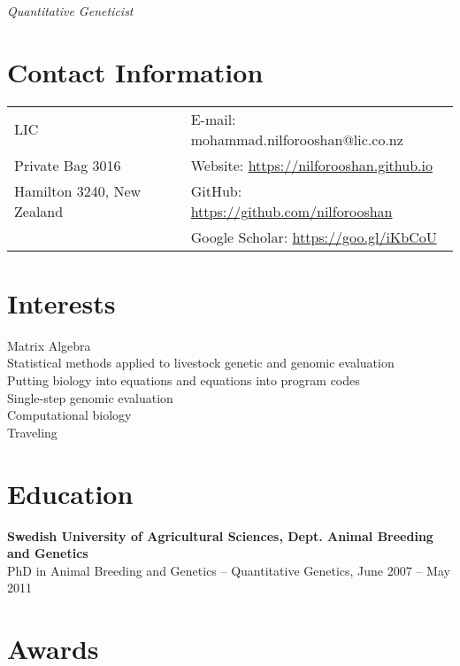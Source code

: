 \documentclass[margin,line]{res}
\begin{document}
 \hfill {\em Quantitative Geneticist}

\begin{resume}
\section{\sc Contact Information}

\vspace{.05in}
\begin{tabular}{@{}p{3.5in}p{3in}}
LIC                        & {E-mail:}  mohammad.nilforooshan@lic.co.nz \\
Private Bag 3016           & {Website:} \url{https://nilforooshan.github.io} \\
Hamilton 3240, New Zealand & {GitHub:}  \url{https://github.com/nilforooshan} \\
 & {Google Scholar:} \url{https://goo.gl/iKbCoU}
\end{tabular}
\section{\sc Interests}

Matrix Algebra \\
Statistical methods applied to livestock genetic and genomic evaluation \\
Putting biology into equations and equations into program codes \\
Single-step genomic evaluation \\
Computational biology \\
Traveling
\section{\sc Education}

{\bf Swedish University of Agricultural Sciences, Dept. Animal Breeding and Genetics} \\
PhD in Animal Breeding and Genetics -- Quantitative Genetics, June 2007 -- May 2011
\section{\sc Awards}


\end{resume}
\end{document}
